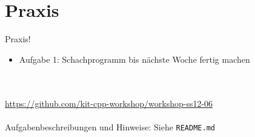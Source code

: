 \section{Praxis}
\begin{frame}[fragile]{Praxis!}
	\begin{itemize}
		\item Aufgabe 1: Schachprogramm bis nächste Woche fertig machen
	\end{itemize}
	\ \\
	\ \\
	\large{\url{https://github.com/kit-cpp-workshop/workshop-ss12-06}} \\
	\ \\
	Aufgabenbeschreibungen und Hinweise: Siehe \verb|README.md|

\end{frame}
